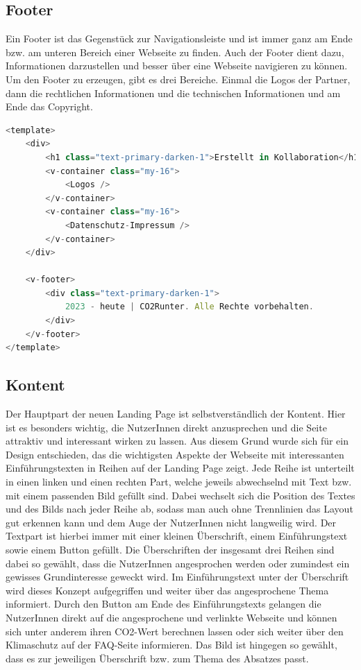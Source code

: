\subsection{Footer}

Ein Footer ist das Gegenstück zur Navigationsleiste und ist immer ganz am Ende bzw. am unteren Bereich einer Webseite zu finden. Auch der Footer dient dazu, Informationen darzustellen und besser über eine Webseite navigieren zu können. Um den Footer zu erzeugen, gibt es drei Bereiche. Einmal die Logos der Partner, dann die rechtlichen Informationen und die technischen Informationen und am Ende das Copyright.

\begin{lstlisting}[language={JavaScript}, caption={Footer Definition}]
<template>
    <div>
        <h1 class="text-primary-darken-1">Erstellt in Kollaboration</h1>
        <v-container class="my-16">
            <Logos />
        </v-container>
        <v-container class="my-16">
            <Datenschutz-Impressum />
        </v-container>
    </div>

    <v-footer>
        <div class="text-primary-darken-1">
            2023 - heute | CO2Runter. Alle Rechte vorbehalten.
        </div>
    </v-footer>
</template>
\end{lstlisting}

\subsection{Kontent}

Der Hauptpart der neuen Landing Page ist selbstverständlich der Kontent. Hier ist es besonders wichtig, die NutzerInnen direkt anzusprechen und die Seite attraktiv und interessant wirken zu lassen. Aus diesem Grund wurde sich für ein Design entschieden, das die wichtigsten Aspekte der Webseite mit interessanten Einführungstexten in Reihen auf der Landing Page zeigt. Jede Reihe ist unterteilt in einen linken und einen rechten Part, welche jeweils abwechselnd mit Text bzw. mit einem passenden Bild gefüllt sind. Dabei wechselt sich die Position des Textes und des Bilds nach jeder Reihe ab, sodass man auch ohne Trennlinien das Layout gut erkennen kann und dem Auge der NutzerInnen nicht langweilig wird. Der Textpart ist hierbei immer mit einer kleinen Überschrift, einem Einführungstext sowie einem Button gefüllt. Die Überschriften der insgesamt drei Reihen sind dabei so gewählt, dass die NutzerInnen angesprochen werden oder zumindest ein gewisses Grundinteresse geweckt wird. Im Einführungstext unter der Überschrift wird dieses Konzept aufgegriffen und weiter über das angesprochene Thema informiert. Durch den Button am Ende des Einführungstexts gelangen die NutzerInnen direkt auf die angesprochene und verlinkte Webseite und können sich unter anderem ihren CO2-Wert berechnen lassen oder sich weiter über den Klimaschutz auf der FAQ-Seite informieren. Das Bild ist hingegen so gewählt, dass es zur jeweiligen Überschrift bzw. zum Thema des Absatzes passt.

